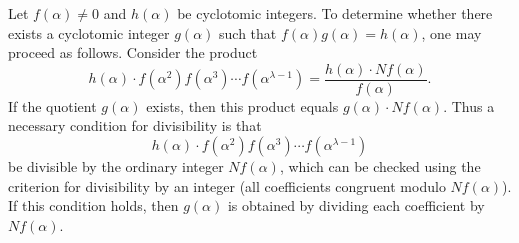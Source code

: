 Let $f(\alpha) \neq 0$ and $h(\alpha)$ be cyclotomic integers. To determine whether there exists a cyclotomic integer $g(\alpha)$ such that $f(\alpha)g(\alpha) = h(\alpha)$, one may proceed as follows. Consider the product
$$h(\alpha) \cdot f(\alpha^2) f(\alpha^3) \cdots f(\alpha^{\lambda-1}) = \frac{h(\alpha) \cdot Nf(\alpha)}{f(\alpha)}.$$
If the quotient $g(\alpha)$ exists, then this product equals $g(\alpha) \cdot Nf(\alpha)$. Thus a necessary condition for divisibility is that
$$h(\alpha) \cdot f(\alpha^2) f(\alpha^3) \cdots f(\alpha^{\lambda-1})$$
be divisible by the ordinary integer $Nf(\alpha)$, which can be checked using the criterion for divisibility by an integer (all coefficients congruent modulo $Nf(\alpha)$). If this condition holds, then $g(\alpha)$ is obtained by dividing each coefficient by $Nf(\alpha)$.
